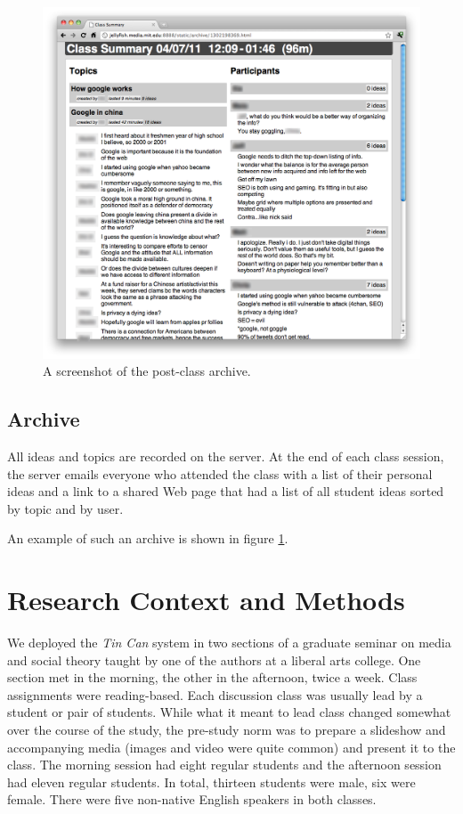 \begin{figure}[t]
\centering
\includegraphics{figures/tincan/archive.png}
\caption{A screenshot of the post-class archive.}
\label{f:archive}
\end{figure}


\subsection{Archive}
All ideas and topics are recorded on the server. At the end of each class session, the server emails everyone who attended the class with a list of their personal ideas and a link to a shared Web page that had a list of all student ideas sorted by topic and by user.

An example of such an archive is shown in figure \ref{f:archive}.




\section{Research Context and Methods}
We deployed the \emph{Tin Can} system in two sections of a graduate seminar on media and social theory taught by one of the authors at a liberal arts college. One section met in the morning, the other in the afternoon, twice a week. Class assignments were reading-based. Each discussion class was usually lead by a student or pair of students. While what it meant to lead class changed somewhat over the course of the study, the pre-study norm was to prepare a slideshow and accompanying media (images and video were quite common) and present it to the class. The morning session had eight regular students and the afternoon session had eleven regular students. In total, thirteen students were male, six were female. There were five non-native English speakers in both classes. 

